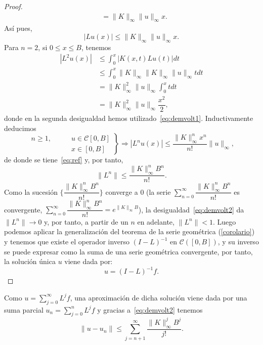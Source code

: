 \begin{proof}
\begin{equation}
\begin{split}
			& = \lVert K \rVert_\infty \lVert u \rVert_\infty x.
		\end{split}
	\end{equation}
	Así pues,
	\begin{equation}\label{eq:demvolt1}
		|Lu(x)| \leqslant \lVert K \rVert_\infty \lVert u \rVert_\infty x.
	\end{equation}
	Para $n = 2$, si $0 \leqslant x \leqslant B$, tenemos
	\begin{equation}
		\begin{split}
			|L^2u(x)| & \leqslant \int_{0}^{x}|K(x,t)Lu(t)|dt \\
			& \leqslant \int_{0}^{x} \lVert K \rVert_\infty \lVert K \rVert_\infty \lVert u \rVert_\infty tdt\\
			& =  \lVert K \rVert_\infty^2 \lVert u \rVert_\infty \int_{0}^{x}tdt \\
			& = \lVert K \rVert_\infty^2 \lVert u \rVert_\infty \dfrac{x^2}{2},
		\end{split}
	\end{equation}
	donde en la segunda desigualdad hemos utilizado~\eqref{eq:demvolt1}. Inductivamente deducimos
	\begin{equation}
		\left.\begin{split}
			n \geqslant 1, \qquad & u \in \mathcal{C}[0,B]\\
			& x \in [0,B]
		\end{split}\right\rbrace \Rightarrow |L^nu(x)| \leqslant \dfrac{\lVert K \rVert_\infty^nx^n}{n!}\lVert u \rVert_\infty,
	\end{equation}
	de donde se tiene~\eqref{eq:ref} y, por tanto, 
	\begin{equation}\label{eq:demvolt2}
		\lVert L^n \rVert \leqslant \dfrac{\lVert K \rVert_\infty^nB^n}{n!}.
	\end{equation}
	Como la sucesión $\{\dfrac{\lVert K \rVert_\infty^nB^n}{n!}\}$ converge a $0$ (la serie $\displaystyle \sum_{n=0}^{\infty}\dfrac{\lVert K \rVert_\infty^nB^n}{n!}$ es convergente, $\displaystyle \sum_{n=0}^{\infty}\dfrac{\lVert K \rVert_\infty^nB^n}{n!} = e^{\lVert K \rVert_\infty B}$), la desigualdad~\eqref{eq:demvolt2} da $\lVert L^n \rVert \rightarrow 0$ y, por tanto, a partir de un $n$ en adelante, $\lVert L^n \rVert < 1$.
	Luego podemos aplicar la generalización del teorema de la serie geométrica (\autoref{corolario}) y tenemos que existe el operador inverso $(I-L)^{-1}$ en $\mathcal{C}([0,B])$, y su inverso se puede expresar como la suma de una serie geométrica convergente, por tanto,  la solución única $u$ viene dada por:
	\begin{equation}
		u = (I-L)^{-1}f.
	\end{equation}
\end{proof}
Como $u = \displaystyle \sum_{j=0}^{\infty} L^jf$, una aproximación de dicha solución viene dada por una suma parcial $u_n = \displaystyle \sum_{j=0}^{n}L^jf$ y gracias a~\eqref{eq:demvolt2} tenemos
\begin{equation}
	\lVert u-u_n \rVert \leqslant \sum_{j=n+1}^{\infty}\dfrac{\lVert K \rVert_\infty^j B^j}{j!}.
\end{equation}
